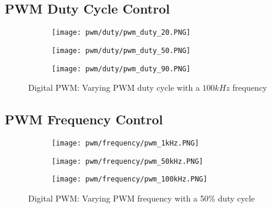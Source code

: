 \subsection*{PWM Duty Cycle Control}
\begin{figure}[H]
    
    \centering
    \begin{subfigure}{0.45\textwidth}
        \texttt{[image: pwm/duty/pwm\_duty\_20.PNG]}
    \end{subfigure}
    \begin{subfigure}{0.45\textwidth}
        \texttt{[image: pwm/duty/pwm\_duty\_50.PNG]}
    \end{subfigure}
    \begin{subfigure}{0.45\textwidth}
        \texttt{[image: pwm/duty/pwm\_duty\_90.PNG]}
    \end{subfigure}
    \caption{Digital PWM: Varying PWM duty cycle with a $100kHz$ frequency}

\end{figure}

\subsection*{PWM Frequency Control}
\begin{figure}[H]
    \centering
    \begin{subfigure}{0.45\textwidth}
        \texttt{[image: pwm/frequency/pwm\_1kHz.PNG]}
    \end{subfigure}
    \begin{subfigure}{0.45\textwidth}
        \texttt{[image: pwm/frequency/pwm\_50kHz.PNG]}
    \end{subfigure}
    \begin{subfigure}{0.45\textwidth}
        \texttt{[image: pwm/frequency/pwm\_100kHz.PNG]}
    \end{subfigure}
    \caption{Digital PWM: Varying PWM frequency with a 50\% duty cycle}

\end{figure}